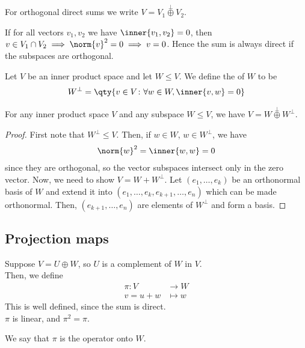 \begin{notation}
	For orthogonal direct sums we write $V = V_1 \overset{\perp}{\oplus} V_2$.
\end{notation} 

\begin{remark}
	If for all vectors $v_1, v_2$ we have $\inner{v_1, v_2} = 0$, then $v \in V_1 \cap V_2 \implies \norm{v}^2 = 0 \implies v = 0$.
	Hence the sum is always direct if the subspaces are orthogonal.
\end{remark}

\begin{definition}[Orthogonal]
	Let $V$ be an inner product space and let $W \leq V$.
	We define the  of $W$ to be
	\begin{align*}
		W^\perp = \qty{v \in V \colon \forall w \in W, \inner{v,w} = 0}
	\end{align*}
\end{definition}

\begin{lemma}
	For any inner product space $V$ and any subspace $W \leq V$, we have $V = W \overset{\perp}{\oplus} W^\perp$.
\end{lemma}

\begin{proof}
	First note that $W^\perp \leq V$.
	Then, if $w \in W$, $w \in W^\perp$, we have
	\begin{align*}
		\norm{w}^2 = \inner{w, w} = 0
	\end{align*}
	since they are orthogonal, so the vector subspaces intersect only in the zero vector.
	Now, we need to show $V = W + W^\perp$.
	Let $(e_1, \dots, e_k)$ be an orthonormal basis of $W$ and extend it into $(e_1, \dots, e_k, e_{k+1}, \dots, e_n)$ which can be made orthonormal.
	Then, $(e_{k+1}, \dots, e_n)$ are elements of $W^\perp$ and form a basis.
\end{proof}

\subsection{Projection maps}
\begin{definition}[Projection]
	Suppose $V = U \oplus W$, so $U$ is a complement of $W$ in $V$. \\
	Then, we define
	\begin{align*}
		\pi : V &\to W \\
		v = u + w &\mapsto w
	\end{align*} 
	This is well defined, since the sum is direct. \\
	$\pi$ is linear, and $\pi^2 = \pi$.

	We say that $\pi$ is the  operator onto $W$.
\end{definition}

